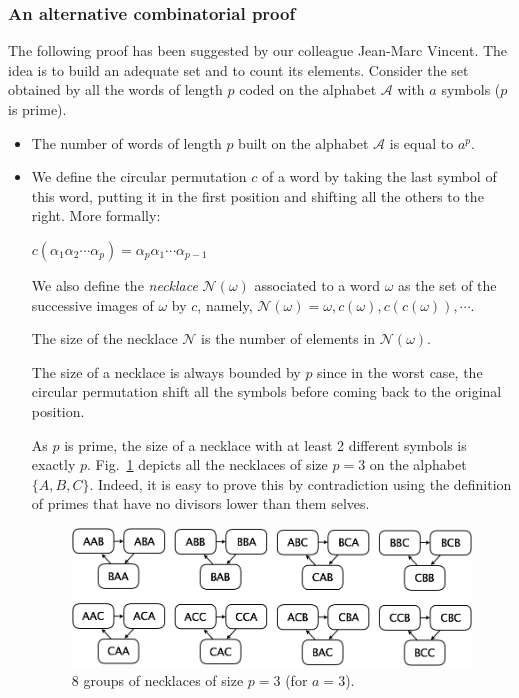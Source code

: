 \subsubsection{An alternative combinatorial proof}

The following proof has been suggested by our colleague Jean-Marc Vincent. 
The idea is to build an adequate set and to count its elements.
Consider the set obtained by all the words of length $p$ coded on the alphabet $\mathcal{A}$ with $a$ symbols ($p$ is prime).

\begin{itemize}
\item The number of words of length $p$ built on the alphabet $\mathcal{A}$ is equal to $a^p$.

\item 

We define the circular permutation $c$ of a word by taking the last symbol of this word, putting
it in the first position and shifting all the others to the right. More formally:

$c(\alpha_1 \alpha_2 \cdots \alpha_p) = \alpha_p \alpha_1 \cdots \alpha_{p-1}$


We also define the \textit{necklace} $\mathcal{N} (\omega)$ associated to a word $\omega$ as the set of the successive images of $\omega$ by $c$, 
namely, $\mathcal{N}(\omega) = {\omega,c(\omega),c(c(\omega)),\cdots}$.

The size of the necklace $\mathcal{N}$ is the number of elements in $\mathcal{N}(\omega)$.

\medskip
The size of a necklace is always bounded by $p$ since in the worst case, the circular permutation shift all the symbols before coming back to the original position. 

As $p$ is prime, the size of a necklace with at least 2 different symbols is exactly $p$.
Fig.~\ref{fig:necklace24} depicts all the necklaces of size $p=3$ on the alphabet $\{ A,B,C \}$.
Indeed, it is easy to prove this by contradiction using the definition of primes that have no divisors lower than them selves.

\begin{figure}[h]
\begin{center}
        \includegraphics[scale=0.25]{FiguresArithmetic/Necklace24.png}
        \caption{8 groups of necklaces of size $p=3$ (for $a=3$).}
        \label{fig:necklace24}
\end{center}
\end{figure}


\end{itemize}
